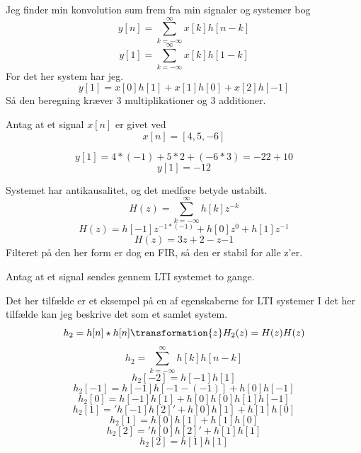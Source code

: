 \begin{EksamensOpgaver}
\begin{Eksamenssæt}[2022 - Forbedringer]
\begin{eksamensOpgave}
        \end{eksamensOpgave}
    \end{Eksamenssæt}
    \begin{Eksamenssæt}[2024 Ordinær]
        \begin{eksamensOpgave}
        \begin{UnderOpgave}
            Jeg finder min konvolution sum frem fra min signaler og systemer bog
            \[y[n] = \sum_{k = -\infty}^{\infty}{x[k] h[n - k]}\]
            \[y[1] = \sum_{k = -\infty}^{\infty}{x[k] h[1 - k]}\]
            For det her system har jeg. 
            \[y[1] = x[0]h[1] + x[1]h[0] + x[2]h[-1]\]
            Så den beregning kræver 3 multiplikationer og 3 additioner. 
        \end{UnderOpgave}
        Antag at et signal $x[n]$ er givet ved 
        \[x[n] = [4, 5, -6]\]
        \begin{UnderOpgave}
            \[y[1] = 4 * (-1) + 5 * 2 + (-6 * 3) = -22 + 10\]
            \[y[1] = -12\]
        \end{UnderOpgave}
        \begin{UnderOpgave}
            Systemet har antikausalitet, og det medføre betyde ustabilt. 
            \[H(z) = \sum_{k = -\infty}^{\infty}h[k]z^{-k}\]
            \[H(z) = h[-1]z^{-1*(-1)} + h[0]z^0 + h[1]z^{-1}\]
            \[H(z) = 3z + 2 - z{-1}\]
            Filteret på den her form er dog en FIR, så den er stabil for alle z'er.             
        \end{UnderOpgave}
        Antag at et signal sendes gennem LTI systemet to gange. 
        \begin{UnderOpgave}
            Det her tilfælde er et eksempel på en af egenskaberne for LTI systemer
            I det her tilfælde kan jeg beskrive det som et samlet system.
            \[h_2 = h[n]\star h[n] \transformation{z} H_2(z) = H(z)H(z)\]
            \[h_2 = \sum_{k = -\infty}^{\infty}{h[k]h[n - k]}\]
            \[h_2[-2]= h[-1]h[1]\]
            \[h_2[-1] = h[-1]h[-1 - (-1)] + h[0]h[-1]\]
            \[h_2[0] = h[-1]h[1] + h[0]h[0] h[1]h[-1]\]
            \[h_2[1] = 'h[-1]h[2]' + h[0]h[1] + h[1]h[0]\]
            \[h_2[1] = h[0]h[1] + h[1]h[0]\]
            \[h_2[2] = 'h[0]h[2]' + h[1]h[1]\]
            \[h_2[2] = h[1]h[1]\]


\end{UnderOpgave}
\end{eksamensOpgave}
\end{Eksamenssæt}
\end{EksamensOpgaver}
